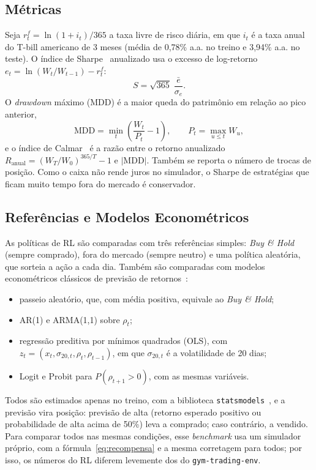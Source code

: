 \documentclass[conference]{IEEEtran}
\begin{document}
\subsection{Métricas}

Seja $r^f_t = \ln(1 + i_t)/365$ a taxa livre de risco diária, em que $i_t$ é a taxa anual do T-bill americano de 3 meses (média de 0,78\% a.a. no treino e 3,94\% a.a. no teste). O índice de Sharpe~\cite{sharpe1966} anualizado usa o excesso de log-retorno $e_t = \ln(W_t / W_{t-1}) - r^f_t$:
\begin{equation}
  S = \sqrt{365}\; \frac{\bar{e}}{\sigma_e}.
\end{equation}
O \textit{drawdown} máximo (MDD) é a maior queda do patrimônio em relação ao pico anterior,
\begin{equation}
  \mathrm{MDD} = \min_t \left(\frac{W_t}{P_t} - 1\right), \qquad P_t = \max_{u \le t} W_u,
\end{equation}
e o índice de Calmar~\cite{young1991} é a razão entre o retorno anualizado $R_{\mathrm{anual}} = (W_T / W_0)^{365/T} - 1$ e $|\mathrm{MDD}|$. Também se reporta o número de trocas de posição. Como o caixa não rende juros no simulador, o Sharpe de estratégias que ficam muito tempo fora do mercado é conservador.

\subsection{Referências e Modelos Econométricos}

As políticas de RL são comparadas com três referências simples: \textit{Buy \& Hold} (sempre comprado), fora do mercado (sempre neutro) e uma política aleatória, que sorteia a ação a cada dia. Também são comparadas com modelos econométricos clássicos de previsão de retornos~\cite{campbell1997,tsay2010}:
\begin{itemize}
  \item passeio aleatório, que, com média positiva, equivale ao \textit{Buy \& Hold};
  \item AR(1) e ARMA(1,1) sobre $\rho_t$;
  \item regressão preditiva por mínimos quadrados (OLS), com $z_t = (x_t, \sigma_{20,t}, \rho_t, \rho_{t-1})$, em que $\sigma_{20,t}$ é a volatilidade de 20 dias;
  \item Logit e Probit para $P(\rho_{t+1} > 0)$, com as mesmas variáveis.
\end{itemize}
Todos são estimados apenas no treino, com a biblioteca \texttt{statsmodels}~\cite{statsmodels}, e a previsão vira posição: previsão de alta (retorno esperado positivo ou probabilidade de alta acima de 50\%) leva a comprado; caso contrário, a vendido. Para comparar todos nas mesmas condições, esse \textit{benchmark} usa um simulador próprio, com a fórmula~\eqref{eq:recompensa} e a mesma corretagem para todos; por isso, os números do RL diferem levemente dos do \texttt{gym-trading-env}.
\end{document}

